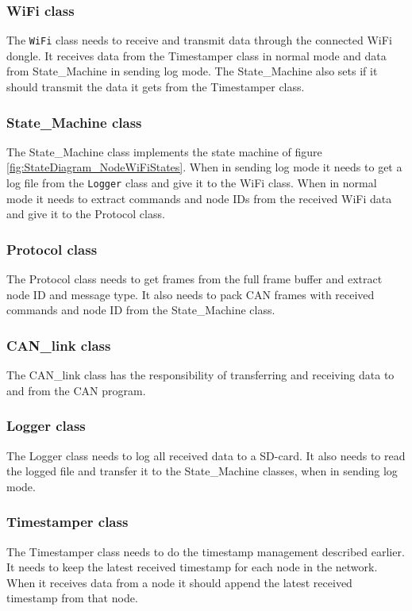 \subsubsection*{WiFi class}
The \texttt{WiFi} class needs to receive and transmit data through the connected WiFi dongle.
It receives data from the Timestamper class in normal mode and data from State\_Machine in sending log mode.
The State\_Machine also sets if it should transmit the data it gets from the Timestamper class. 

\subsubsection*{State\_Machine class}
The State\_Machine class implements the state machine of figure \ref{fig:StateDiagram_NodeWiFiStates}.
When in sending log mode it needs to get a log file from the \texttt{Logger} class and give it to the WiFi class.
When in normal mode it needs to extract commands and node IDs from the received WiFi data and give it to the Protocol class.

\subsubsection*{Protocol class}
The Protocol class needs to get frames from the full frame buffer and extract node ID and message type. 
It also needs to pack CAN frames with received commands and node ID from the State\_Machine class.

\subsubsection*{CAN\_link class}
The CAN\_link class has the responsibility of transferring and receiving data to
and from the CAN program.

\subsubsection*{Logger class}
The Logger class needs to log all received data to a SD-card.
It also needs to read the logged file and transfer it to the State\_Machine classes, when in sending log mode.

\subsubsection*{Timestamper class}
The Timestamper class needs to do the timestamp management described earlier.
It needs to keep the latest received timestamp for each node in the network.
When it receives data from a node it should append the latest received timestamp from that node.  

